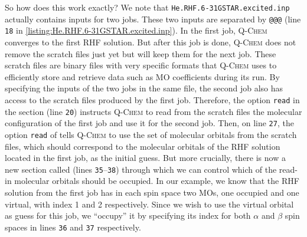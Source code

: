 			So how does this work exactly?
			We note that \texttt{He.RHF.6-31GSTAR.excited.inp} actually contains inputs for two jobs.
			These two inputs are separated by \texttt{@@@} (line \texttt{18} in \cref{listing:He.RHF.6-31GSTAR.excited.inp}).
			In the first job, \textsc{Q-Chem} converges to the first RHF solution.
			But after this job is done, \textsc{Q-Chem} does not remove the scratch files just yet but will keep them for the next job.
			These scratch files are binary files with very specific formats that \textsc{Q-Chem} uses to efficiently store and retrieve data such as MO coefficients during its run.
			By specifying the inputs of the two jobs in the same file, the second job also has access to the scratch files produced by the first job.
			Therefore, the option \texttt{read} in the  section (line \texttt{20}) instructs \textsc{Q-Chem} to read from the scratch files the molecular configuration of the first job and use it for the second job.
			Then, on line \texttt{27}, the option \texttt{read} of  tells \textsc{Q-Chem} to use the set of molecular orbitals from the scratch files, which should correspond to the molecular orbitals of the RHF solution located in the first job, as the initial guess.
			But more crucially, there is now a new section called  (lines \texttt{35}--\texttt{38}) through which we can control which of the read-in molecular orbitals should be occupied.
			In our example, we know that the RHF solution from the first job has in each spin space two MOs, one occupied and one virtual, with index 1 and 2 respectively.
			Since we wish to use the virtual orbital as guess for this job, we ``occupy'' it by specifying its index for both $\alpha$ and $\beta$ spin spaces in lines \texttt{36} and \texttt{37} respectively.
			
